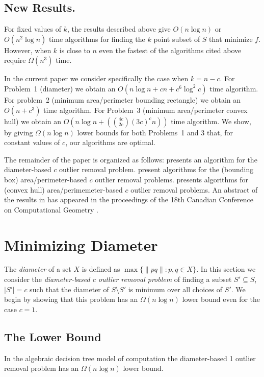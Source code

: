 \documentclass[lotsofwhite]{patmorin}
\newcommand{\runtime}{n\log n + \left({4c\choose 2c}(3c)^cn\right)}
\newcommand{\Oruntime}{O\left(\runtime\right)}
\begin{document}
\subsection{New Results.}

For fixed values of $k$, the results described above give $O(n\log n)$
or $O(n^2\log n)$ time algorithms for finding the $k$ point subset of
$S$ that minimize $f$.  However, when $k$ is close to $n$ even the
fastest of the algorithms cited above require $\Omega(n^3)$ time.  

In the current paper we consider specifically the case when $k=n-c$.
For Problem~1 (diameter) we obtain an $O(n\log n + cn + c^6\log^2 c)$
time algorithm.  For problem~2 (minimum area/perimeter bounding
rectangle) we obtain an $O(n + c^3)$ time algorithm.  For Problem~3
(minimum area/perimeter convex hull) we obtain an $\Oruntime$ time
algorithm.  We show, by giving $\Omega(n\log n)$ lower bounds for both
Problems~1 and 3 that, for constant values of $c$, our algorithms are
optimal.

The remainder of the paper is organized as follows: 
presents an algorithm for the diameter-based $c$ outlier removal
problem.   present algorithms for the (bounding box)
area/perimeter-based $c$ outlier removal problems.  
presents algorithms for (convex hull) area/perimemeter-based $c$
outlier removal problems.  An abstract of the results in 
has appeared in the proceedings of the 18th Canadian Conference on
Computational Geometry \cite{amw06}.

\section{Minimizing Diameter}

The \emph{diameter} of a set $X$ is defined as $\max\{\|pq\|:p,q\in
X\}$.  In this section we consider the \emph{diameter-based $c$ outlier
removal problem} of finding a subset $S'\subseteq S$, $|S'|=c$ such
that the diameter of $S\setminus S'$ is minimum over all choices of
$S'$.  We begin by showing that this problem has an $\Omega(n\log n)$
lower bound even for the case $c=1$.

\subsection{The Lower Bound}

\begin{thm}
In the algebraic decision tree model of computation the diameter-based
1 outlier removal problem has 
an $\Omega(n\log n)$ lower bound.
\end{thm}
\end{document}
